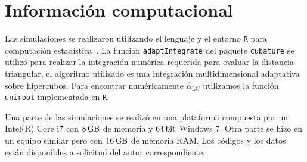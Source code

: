 \chapter{Información computacional}


Las simulaciones se realizaron utilizando el lenguaje y el entorno \texttt R para computación estadística~\cite{RLanguage}.
La función \texttt{adaptIntegrate} del paquete \texttt{cubature} se utilizó para realizar la integración numérica requerida para evaluar la distancia triangular, el algoritmo utilizado es una integración multidimensional adaptativa sobre hipercubos. Para encontrar numéricamente $\widehat\alpha_{\text{LC}}$ utilizamos la función \texttt{uniroot} implementada en \texttt R.

Una parte de las simulaciones se realizó en una plataforma compuesta por un Intel(R) Core i7 con $\SI{8}{\giga\byte}$ de memoria y $\SI{64}{\bit}$  Windows  7. Otra parte se hizo en un equipo similar pero con $\SI{16}{\giga\byte}$ de memoria RAM.
Los códigos y los datos están disponibles a solicitud del autor correspondiente.

\newpage
$\ $
\thispagestyle{empty} %
